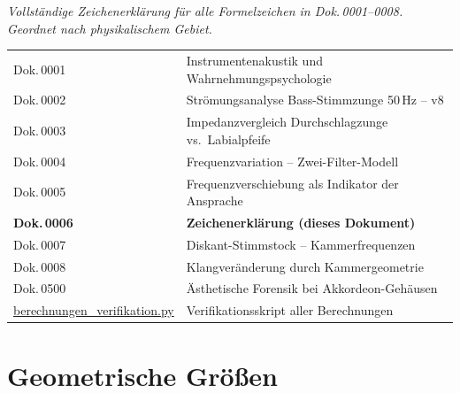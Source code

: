 \documentclass[11pt,a4paper]{article}
\begin{document}
\hbmaketitle

{\small\itshape Vollständige Zeichenerklärung für alle Formelzeichen in Dok.\,0001--0008. Geordnet nach physikalischem Gebiet.}

\vspace{2mm}
\begin{center}\small
\begin{tabularx}{\textwidth}{l X}
\hbtoprule
Dok.\,0001 & Instrumentenakustik und Wahrnehmungspsychologie \\
Dok.\,0002 & Strömungsanalyse Bass-Stimmzunge 50\,Hz -- v8 \\
Dok.\,0003 & Impedanzvergleich Durchschlagzunge vs.\ Labialpfeife \\
Dok.\,0004 & Frequenzvariation -- Zwei-Filter-Modell \\
Dok.\,0005 & Frequenzverschiebung als Indikator der Ansprache \\
\textbf{Dok.\,0006} & \textbf{Zeichenerklärung (dieses Dokument)} \\
Dok.\,0007 & Diskant-Stimmstock -- Kammerfrequenzen \\
Dok.\,0008 & Klangveränderung durch Kammergeometrie \\
Dok.\,0500 & Ästhetische Forensik bei Akkordeon-Gehäusen \\
\midrule
\href{berechnungen_verifikation.py}{berechnungen\_verifikation.py} & Verifikationsskript aller Berechnungen \\
\bottomrule
\end{tabularx}
\end{center}
\vspace{4mm}

\section{Geometrische Größen}
\end{document}
